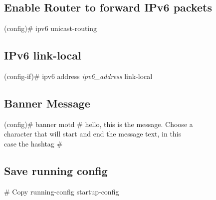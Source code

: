 \subsection{Enable Router to forward IPv6 packets}
(config)\# ipv6 unicast-routing

\subsection{IPv6 link-local}
(config-if)\# ipv6 address \textit{ipv6\_address} link-local

\subsection{Banner Message}
(config)\# banner motd \# hello, this is the message. Choose a \\character that will start and end the message text, in this \\case the hashtag \#

\subsection{Save running config}
\# Copy running-config startup-config
